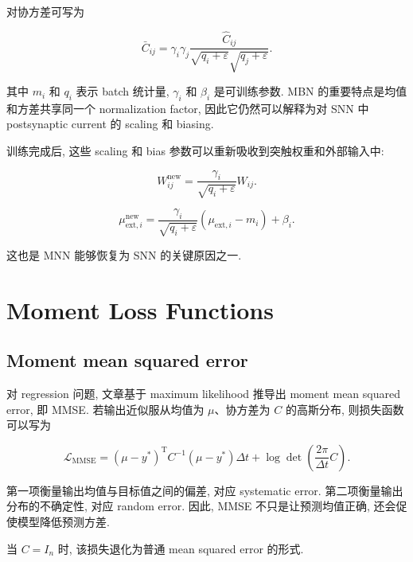 \documentclass[oneside]{ctexart}
\begin{document}
对协方差可写为

\begin{equation}
    \bar{C}_{ij}
    =
    \gamma_i\gamma_j
    \dfrac{\hat{C}_{ij}}
    {\sqrt{q_i+\varepsilon}\sqrt{q_j+\varepsilon}}.
\end{equation}

其中 $m_i$ 和 $q_i$ 表示 batch 统计量, $\gamma_i$ 和 $\beta_i$ 是可训练参数. MBN 的重要特点是均值和方差共享同一个 normalization factor, 因此它仍然可以解释为对 SNN 中 postsynaptic current 的 scaling 和 biasing.

训练完成后, 这些 scaling 和 bias 参数可以重新吸收到突触权重和外部输入中:

\begin{equation}
    W_{ij}^{\mathrm{new}}
    =
    \dfrac{\gamma_i}{\sqrt{q_i+\varepsilon}}W_{ij}.
\end{equation}

\begin{equation}
    \mu_{\mathrm{ext},i}^{\mathrm{new}}
    =
    \dfrac{\gamma_i}{\sqrt{q_i+\varepsilon}}
    (\mu_{\mathrm{ext},i}-m_i)
    +
    \beta_i.
\end{equation}

这也是 MNN 能够恢复为 SNN 的关键原因之一.

\section{Moment Loss Functions}

\subsection{Moment mean squared error}

对 regression 问题, 文章基于 maximum likelihood 推导出 moment mean squared error, 即 MMSE. 若输出近似服从均值为 $\mu$、协方差为 $C$ 的高斯分布, 则损失函数可以写为

\begin{equation}
    \mathcal{L}_{\mathrm{MMSE}}
    =
    (\mu-y^*)^{\mathrm T}C^{-1}(\mu-y^*)\Delta t
    +
    \log\det\left(
        \dfrac{2\pi}{\Delta t}C
    \right).
\end{equation}

第一项衡量输出均值与目标值之间的偏差, 对应 systematic error. 第二项衡量输出分布的不确定性, 对应 random error. 因此, MMSE 不只是让预测均值正确, 还会促使模型降低预测方差.

当 $C=I_n$ 时, 该损失退化为普通 mean squared error 的形式.
\end{document}
